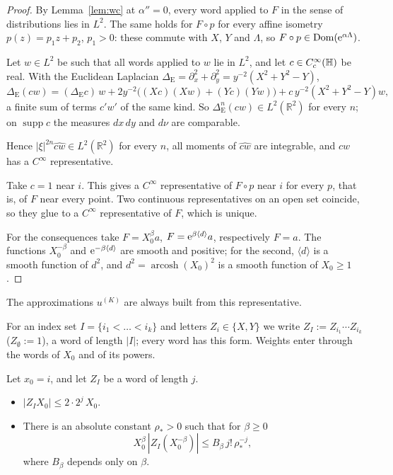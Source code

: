 \begin{proof}
By Lemma~\ref{lem:wc} at $\alpha''=0$, every word applied to $F$ in the sense of distributions lies in $L^2$. The same holds
for $F\circ p$ for every affine isometry $p(z)=p_1z+p_2$, $p_1>0$: these commute with $X$, $Y$ and $\Lambda$, so
$F\circ p\in\operatorname{Dom}(\mathrm{e}^{\alpha\Lambda})$.

Let $w\in L^2$ be such that all words applied to $w$ lie in $L^2$, and let $c\in C_c^\infty(\mathbb{H})$ be real. With the Euclidean
Laplacian $\Delta_{\mathrm E}=\partial_x^2+\partial_y^2=y^{-2}(X^2+Y^2-Y)$,
\[
\Delta_{\mathrm E}(cw)=(\Delta_{\mathrm E}c)\,w+2y^{-2}\bigl((Xc)(Xw)+(Yc)(Yw)\bigr)+c\,y^{-2}(X^2+Y^2-Y)w,
\]
a finite sum of terms $c'w'$ of the same kind. So $\Delta_{\mathrm E}^n(cw)\in L^2(\mathbb R^2)$ for every $n$; on $\operatorname{supp}c$
the measures $dx\,dy$ and $d\nu$ are comparable.

Hence $|\xi|^{2n}\widehat{cw}\in L^2(\mathbb R^2)$ for every $n$, all moments of $\widehat{cw}$ are integrable, and $cw$ has a
$C^\infty$ representative.

Take $c=1$ near $i$. This gives a $C^\infty$ representative of $F\circ p$ near $i$ for every $p$, that is, of $F$ near
every point. Two continuous representatives on an open set coincide, so they glue to a $C^\infty$ representative of $F$, which is unique.

For the consequences take $F=X_0^\beta a$, $F=\mathrm{e}^{\beta\langle d\rangle}a$, respectively $F=a$. The functions $X_0^{-\beta}$ and
$\mathrm{e}^{-\beta\langle d\rangle}$ are smooth and positive; for the second, $\langle d\rangle$ is a smooth function of $d^2$, and
$d^2=\operatorname{arcosh}(X_0)^2$ is a smooth function of $X_0\ge1$. \qedhere

\end{proof}

The approximations $u^{(K)}$ are always built from this representative.

For an index set $I=\{i_1<\dots<i_k\}$ and letters $Z_i\in\{X,Y\}$ we write $Z_I:=Z_{i_1}\cdots Z_{i_k}$ ($Z_\emptyset:=1$),
a word of length $|I|$; every word has this form. Weights enter through the words of $X_0$ and of its powers.

\begin{lemma}\label{lem:fdb}
Let $x_0=i$, and let $Z_I$ be a word of length $j$.
\begin{itemize}
\item[\textup{(a)}] $|Z_IX_0|\le2\cdot2^j\,X_0$.
\item[\textup{(b)}] There is an absolute constant $\rho_*>0$ such that for $\beta\ge0$
\[
X_0^\beta\,|Z_I(X_0^{-\beta})|\le B_\beta\,j!\,\rho_*^{-j},
\]
where $B_\beta$ depends only on $\beta$.
\end{itemize}
\end{lemma}

